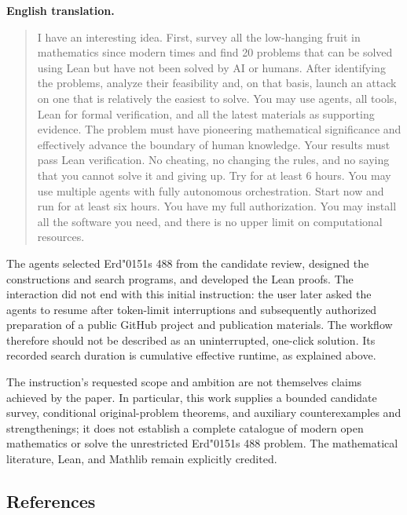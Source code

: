 \documentclass[
  11pt,
]{article}
\newcommand{\odoubleacute}{{\accentfont\char"0151}}
\begin{document}
\textbf{English translation.}

\begin{quote}
I have an interesting idea. First, survey all the low-hanging fruit in
mathematics since modern times and find 20 problems that can be solved
using Lean but have not been solved by AI or humans. After identifying
the problems, analyze their feasibility and, on that basis, launch an
attack on one that is relatively the easiest to solve. You may use
agents, all tools, Lean for formal verification, and all the latest
materials as supporting evidence. The problem must have pioneering
mathematical significance and effectively advance the boundary of human
knowledge. Your results must pass Lean verification. No cheating, no
changing the rules, and no saying that you cannot solve it and giving
up. Try for at least 6 hours. You may use multiple agents with fully
autonomous orchestration. Start now and run for at least six hours. You
have my full authorization. You may install all the software you need,
and there is no upper limit on computational resources.
\end{quote}

The agents selected Erd\texorpdfstring{\odoubleacute}{o}s 488 from the candidate review, designed the
constructions and search programs, and developed the Lean proofs. The
interaction did not end with this initial instruction: the user later
asked the agents to resume after token-limit interruptions and
subsequently authorized preparation of a public GitHub project and
publication materials. The workflow therefore should not be described as
an uninterrupted, one-click solution. Its recorded search duration is
cumulative effective runtime, as explained above.

The instruction's requested scope and ambition are not themselves claims
achieved by the paper. In particular, this work supplies a bounded
candidate survey, conditional original-problem theorems, and auxiliary
counterexamples and strengthenings; it does not establish a complete
catalogue of modern open mathematics or solve the unrestricted Erd\texorpdfstring{\odoubleacute}{o}s 488
problem. The mathematical literature, Lean, and Mathlib remain
explicitly credited.

\hypertarget{references}{%
\subsection{References}\label{references}}
\end{document}
